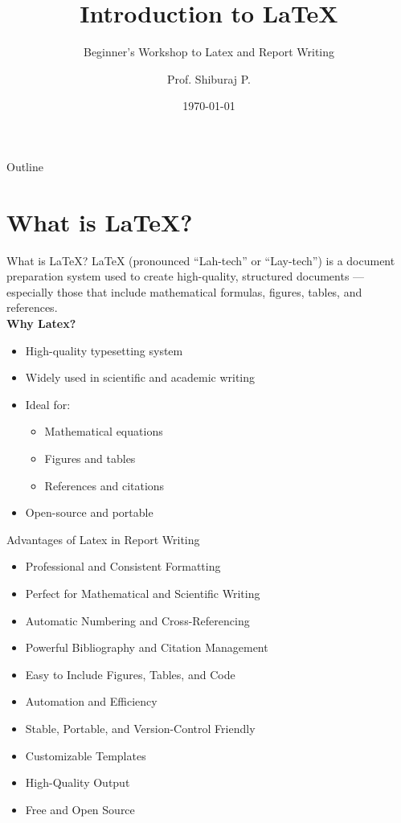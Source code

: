 \documentclass{beamer}
\title[Intro to LaTeX]{Introduction to LaTeX}
\subtitle{Beginner's Workshop to Latex and Report Writing}
\author{Prof. Shiburaj P.}
\institute[RCOE]{Rizvi College of Engineering}
\date{\today}
\begin{document}
\begin{frame}
  \titlepage
\end{frame}

\begin{frame}{Outline}
  \tableofcontents
\end{frame}

\section{What is LaTeX?}
\begin{frame}{What is LaTeX?}
	LaTeX (pronounced “Lah-tech” or “Lay-tech”) is a document preparation system used to create high-quality, structured documents — especially those that include mathematical formulas, figures, tables, and references.\\
	
	\textbf{Why Latex?}
\begin{itemize}
    \item High-quality typesetting system
    \item Widely used in scientific and academic writing
    \item Ideal for:
      \begin{itemize}
          \item Mathematical equations
          \item Figures and tables
          \item References and citations
      \end{itemize}
    \item Open-source and portable
\end{itemize}
\end{frame}

\begin{frame}{Advantages of Latex in Report Writing}
	\begin{itemize}
		\item Professional and Consistent Formatting
		\item Perfect for Mathematical and Scientific Writing
		\item Automatic Numbering and Cross-Referencing
		\item Powerful Bibliography and Citation Management
		\item Easy to Include Figures, Tables, and Code
		\item Automation and Efficiency
		\item Stable, Portable, and Version-Control Friendly
		\item Customizable Templates
		\item High-Quality Output
		\item Free and Open Source
	\end{itemize}
\end{frame}
\end{document}
